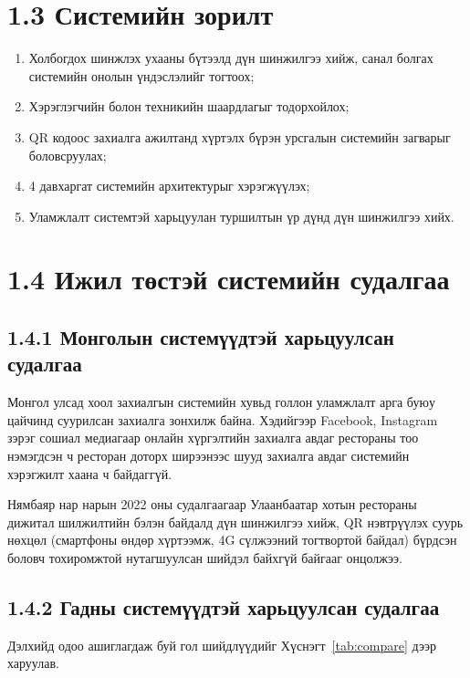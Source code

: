\section{1.3 Системийн зорилт}

\begin{enumerate}
    \item Холбогдох шинжлэх ухааны бүтээлд дүн шинжилгээ хийж, санал болгах
          системийн онолын үндэслэлийг тогтоох;
    \item Хэрэглэгчийн болон техникийн шаардлагыг тодорхойлох;
    \item QR кодоос захиалга ажилтанд хүртэлх бүрэн урсгалын системийн загварыг
          боловсруулах;
    \item 4 давхаргат системийн архитектурыг хэрэгжүүлэх;
    \item Уламжлалт системтэй харьцуулан туршилтын үр дүнд дүн шинжилгээ хийх.
\end{enumerate}

\section{1.4 Ижил төстэй системийн судалгаа}

\subsection{1.4.1 Монголын системүүдтэй харьцуулсан судалгаа}

Монгол улсад хоол захиалгын системийн хувьд голлон уламжлалт арга буюу цайчинд
суурилсан захиалга зонхилж байна. Хэдийгээр Facebook, Instagram зэрэг сошиал
медиагаар онлайн хүргэлтийн захиалга авдаг рестораны тоо нэмэгдсэн ч ресторан
доторх ширээнээс шууд захиалга авдаг системийн хэрэгжилт хаана ч байдаггүй.

Нямбаяр нар \cite{nyambayar2022} нарын 2022 оны судалгаагаар Улаанбаатар хотын
рестораны дижитал шилжилтийн бэлэн байдалд дүн шинжилгээ хийж, QR нэвтрүүлэх
суурь нөхцөл (смартфоны өндөр хүртээмж, 4G сүлжээний тогтвортой байдал) бүрдсэн
боловч тохиромжтой нутагшуулсан шийдэл байхгүй байгааг онцолжээ.

\subsection{1.4.2 Гадны системүүдтэй харьцуулсан судалгаа}

Дэлхийд одоо ашиглагдаж буй гол шийдлүүдийг Хүснэгт~\ref{tab:compare} дээр харуулав.

